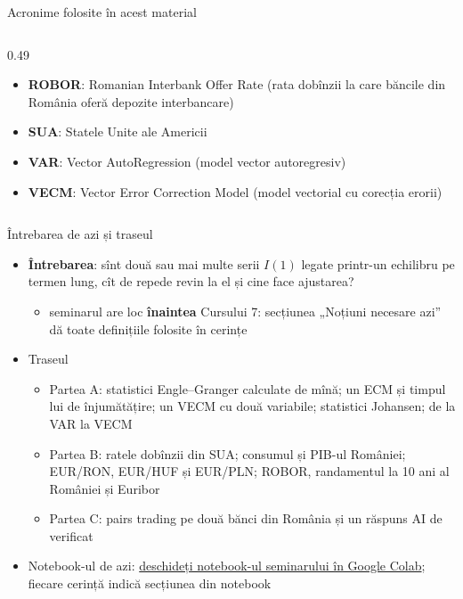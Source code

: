 \begin{frame}{Acronime folosite în acest material}
\begin{columns}[T]
\begin{column}{0.49\textwidth}
\begin{itemize}
    \item \textbf{ROBOR}: Romanian Interbank Offer Rate (rata dobînzii la care băncile din România oferă depozite interbancare)
    \item \textbf{SUA}: Statele Unite ale Americii
    \item \textbf{VAR}: Vector AutoRegression (model vector autoregresiv)
    \item \textbf{VECM}: Vector Error Correction Model (model vectorial cu corecția erorii)
\end{itemize}
\end{column}
\end{columns}
\end{frame}

\begin{frame}{Întrebarea de azi și traseul}
\itemsize{\small}
\begin{itemize}
    \item \textbf{Întrebarea}: sînt două sau mai multe serii $I(1)$ legate printr-un echilibru pe termen lung, cît de repede revin la el și cine face ajustarea?
    \begin{itemize}
        \item seminarul are loc \textbf{înaintea} Cursului 7: secțiunea „Noțiuni necesare azi” dă toate definițiile folosite în cerințe
    \end{itemize}
    \item Traseul
    \begin{itemize}
        \item Partea A: statistici Engle--Granger calculate de mînă; un ECM și timpul lui de înjumătățire; un VECM cu două variabile; statistici Johansen; de la VAR la VECM
        \item Partea B: ratele dobînzii din SUA; consumul și PIB-ul României; EUR/RON, EUR/HUF și EUR/PLN; ROBOR, randamentul la 10 ani al României și Euribor
        \item Partea C: pairs trading pe două bănci din România și un răspuns AI de verificat
    \end{itemize}
    \item Notebook-ul de azi: \href{\nb}{deschideți notebook-ul seminarului în Google Colab}; fiecare cerință indică secțiunea din notebook
\end{itemize}
\end{frame}

